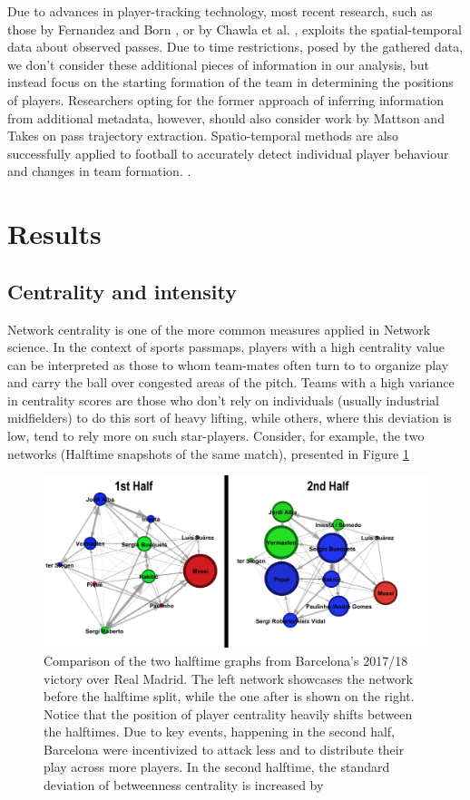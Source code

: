 \documentclass[9pt,twocolumn,twoside]{pnas-report}
\begin{document}
Due to advances in player-tracking technology, most recent research, such as those by Fernandez and Born \cite{fbrn}, or by Chawla et al. \cite{chawla}, exploits the spatial-temporal data about observed passes. Due to time restrictions, posed by the gathered data, we don't consider these additional pieces of information in our analysis, but instead focus on the starting formation of the team in determining the positions of players. Researchers opting for the former approach of inferring information from additional metadata, however, should also consider work by Mattson and Takes \cite{trajectory} on pass trajectory extraction. Spatio-temporal methods are also successfully applied to football to accurately detect individual player behaviour and changes in team formation. \cite{bialkowski2014large}.

\section*{Results}

\subsection*{Centrality and intensity}
Network centrality is one of the more common measures applied in Network science. In the context of sports passmaps, players with a high centrality value can be interpreted as those to whom team-mates often turn to to organize play and carry the ball over congested areas of the pitch. Teams with a high variance in centrality scores are those who don't rely on individuals (usually industrial midfielders) to do this sort of heavy lifting, while others, where this deviation is low, tend to rely more on such star-players. Consider, for example, the two networks (Halftime snapshots of the same match), presented in Figure \ref{fig:BarcaHalves}



\begin{figure}[t]\centering
	\includegraphics[width=\linewidth]{BarcaHalves.png}
	\caption{Comparison of the two halftime graphs from Barcelona's 2017/18 victory over Real Madrid. The left network showcases the network before the halftime split, while the one after is shown on the right. Notice that the position of player centrality heavily shifts between the halftimes. Due to key events, happening in the second half, Barcelona were incentivized to attack less and to distribute their play across more players. In the second halftime, the standard deviation of betweenness centrality is increased by  }
	\label{fig:BarcaHalves}
\end{figure}
\end{document}
